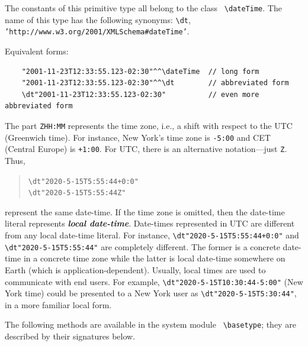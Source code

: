 \documentclass[11pt]{article}
\newcommand{\ERGO}{\mbox{\smaller{\ensuremath{\cal{E}}\smaller{{\sc{RGO}}}}}\xspace}
\newcommand{\FLSYSTEM}{\ERGO}
\newcommand{\bs}{\textbackslash}
\begin{document}
\index{class!\bs{}dateTime}
The constants of this primitive type all belong to the class {\tt
  \bs{}dateTime}.  The name of this type has the following synonyms:
{\tt \bs{}dt},  {\tt 'http://www.w3.org/2001/XMLSchema\#dateTime'}. 

\noindent
Equivalent forms:
\begin{verbatim}
    "2001-11-23T12:33:55.123-02:30"^^\dateTime  // long form
    "2001-11-23T12:33:55.123-02:30"^^\dt        // abbreviated form
    \dt"2001-11-23T12:33:55.123-02:30"          // even more abbreviated form
\end{verbatim}

The part \texttt{ZHH:MM} represents the time zone, i.e., a shift with
respect to the UTC (Greenwich time). For instance, New York's time zone is
\texttt{-5:00} and CET (Central Europe) is \texttt{+1:00}.  For UTC, there
is an alternative notation---just \texttt{Z}. Thus,
\begin{quote}
 \verb|\dt"2020-5-15T5:55:44+0:0"|
 \\
 \verb|\dt"2020-5-15T5:55:44Z"| 
\end{quote}
represent the same date-time.  If the time zone is omitted, then the
date-time literal represents \emph{\textbf{local date-time}}.
Date-times represented in UTC are different from any local date-time literal.
For instance, \verb|\dt"2020-5-15T5:55:44+0:0"| and
\verb|\dt"2020-5-15T5:55:44"| are completely different. The former is a
concrete date-time in a concrete time zone while the latter is local date-time
somewhere on Earth (which is application-dependent).
Usually, local times are used to communicate with end users.
For example, \verb|\dt"2020-5-15T10:30:44-5:00"| (New York time) could be
presented to a New York user as \verb|\dt"2020-5-15T5:30:44"|, in a
more familiar local form.

\noindent
The following methods are available in the \FLSYSTEM system module {\tt
  \bs{}basetype}; they are described by their signatures below.
\end{document}
